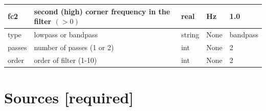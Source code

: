 \documentclass[11pt]{report}
\begin{document}
{\begin{center}
\begin{tabular}{|l|p{8cm}|l|l|l|}
		fc2         & second (high) corner frequency in the filter $(>0)$ & real      & Hz         & 1.0          \\ \hline
		type        & lowpass or bandpass                                 & string    & None       & bandpass     \\ \hline
		passes      & number of passes (1 or 2)                           & int       & None       & 2            \\ \hline
		order       & order of filter (1-10)                              & int       & None       & 2            \\ \hline
	\end{tabular}
\end{center}

\section{Sources [required]}

}
\end{document}
